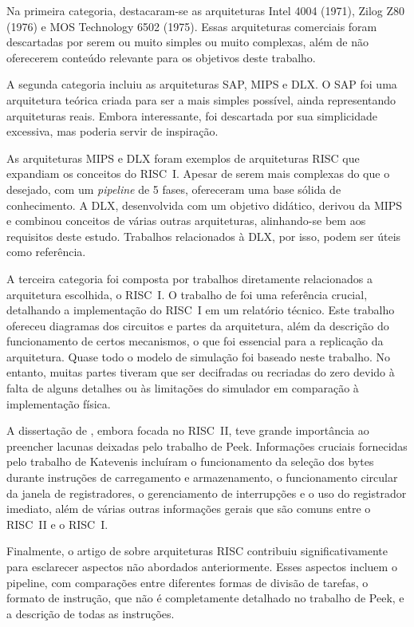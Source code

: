 \documentclass[
	12pt,				%
	openright,			%
	oneside,			%
	a4paper,			%
	english,			%
	french,				%
	spanish,			%
	brazil,				%
	]{abntex2}
\begin{document}
Na primeira categoria, destacaram-se as arquiteturas Intel 4004 (1971), Zilog Z80 (1976) e MOS Technology 6502 (1975). Essas arquiteturas comerciais foram descartadas por serem ou muito simples ou muito complexas, além de não oferecerem conteúdo relevante para os objetivos deste trabalho.

A segunda categoria incluiu as arquiteturas SAP, MIPS e DLX. O SAP \cite{malvino_digital_1993} foi uma arquitetura teórica criada para ser a mais simples possível, ainda representando arquiteturas reais. Embora interessante, foi descartada por sua simplicidade excessiva, mas poderia servir de inspiração.

As arquiteturas MIPS e DLX \cite{patterson_computer_1996} foram exemplos de arquiteturas RISC que expandiam os conceitos do RISC~I. Apesar de serem mais complexas do que o desejado, com um \textit{pipeline} de 5 fases, ofereceram uma base sólida de conhecimento. A DLX, desenvolvida com um objetivo didático, derivou da MIPS e combinou conceitos de várias outras arquiteturas, alinhando-se bem aos requisitos deste estudo. Trabalhos relacionados à DLX, por isso, podem ser úteis como referência.

A terceira categoria foi composta por trabalhos diretamente relacionados a arquitetura escolhida, o RISC~I. O trabalho de  foi uma referência crucial, detalhando a implementação do RISC~I em um relatório técnico. Este trabalho ofereceu diagramas dos circuitos e partes da arquitetura, além da descrição do funcionamento de certos mecanismos, o que foi essencial para a replicação da arquitetura. Quase todo o modelo de simulação foi baseado neste trabalho. No entanto, muitas partes tiveram que ser decifradas ou recriadas do zero devido à falta de alguns detalhes ou às limitações do simulador em comparação à implementação física.

A dissertação de , embora focada no RISC~II, teve grande importância ao preencher lacunas deixadas pelo trabalho de Peek. Informações cruciais fornecidas pelo trabalho de Katevenis incluíram o funcionamento da seleção dos bytes durante instruções de carregamento e armazenamento, o funcionamento circular da janela de registradores, o gerenciamento de interrupções e o uso do registrador imediato, além de várias outras informações gerais que são comuns entre o RISC~II e o RISC~I.

Finalmente, o artigo de  sobre arquiteturas RISC contribuiu significativamente para esclarecer aspectos não abordados anteriormente. Esses aspectos incluem o pipeline, com comparações entre diferentes formas de divisão de tarefas, o formato de instrução, que não é completamente detalhado no trabalho de Peek, e a descrição de todas as instruções.
\end{document}
